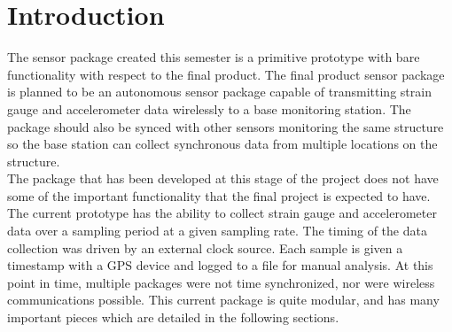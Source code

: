 \section{Introduction}
The sensor package created this semester is a primitive prototype with
bare functionality with respect to the final product. The final
product sensor package is planned to be an autonomous sensor package
capable of transmitting strain gauge and accelerometer data
wirelessly to a base monitoring station. The package  should also
be synced with other sensors monitoring the same structure so the
base station can collect synchronous data from multiple locations
on the structure. \\

The package that has been developed at this stage of the project does
not have some of the important functionality that the final project
is expected to have. The current prototype has the ability to
collect strain gauge and accelerometer data over a sampling
period at a given sampling rate. The timing of the data
collection was driven by an external clock source. Each sample
is given a timestamp with a GPS device and logged to a file
for manual analysis. At this point in time, multiple packages
were not time synchronized, nor were wireless communications
possible. This current package is quite modular, and has
many important pieces which are detailed in the following
sections.
